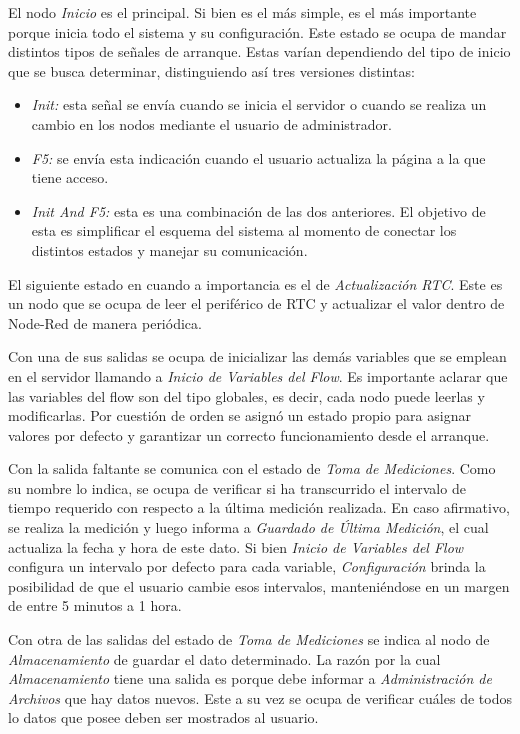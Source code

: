 
El nodo \textit{Inicio} es el principal. Si bien es el más simple, es el más importante porque inicia todo el sistema y su configuración. Este estado se ocupa de mandar distintos tipos de señales de arranque. Estas varían dependiendo del tipo de inicio que se busca determinar, distinguiendo así tres versiones distintas:
\begin{itemize}
	\item \textit{Init:} esta señal se envía cuando se inicia el servidor o cuando se realiza un cambio en los nodos mediante el usuario de administrador.
	\item \textit{F5:} se envía esta indicación cuando el usuario actualiza la página a la que tiene acceso.
	\item \textit{Init And F5:} esta es una combinación de las dos anteriores. El objetivo de esta es simplificar el esquema del sistema al momento de conectar los distintos estados y manejar su comunicación.
\end{itemize}

El siguiente estado en cuando a importancia es el de \textit{Actualización RTC}. Este es un nodo que se ocupa de leer el periférico de RTC y actualizar el valor dentro de Node-Red de manera periódica.

Con una de sus salidas se ocupa de inicializar las demás variables que se emplean en el servidor llamando a \textit{Inicio de Variables del Flow}. Es importante aclarar que las variables del flow son del tipo globales, es decir, cada nodo puede leerlas y modificarlas. Por cuestión de orden se asignó un estado propio para asignar valores por defecto y garantizar un correcto funcionamiento desde el arranque.

Con la salida faltante se comunica con el estado de \textit{Toma de Mediciones}. Como su nombre lo indica, se ocupa de verificar si ha transcurrido el intervalo de tiempo requerido con respecto a la última medición realizada. En caso afirmativo, se realiza la medición y luego informa a \textit{Guardado de Última Medición}, el cual actualiza la fecha y hora de este dato. Si bien \textit{Inicio de Variables del Flow} configura un intervalo por defecto para cada variable, \textit{Configuración} brinda la posibilidad de que el usuario cambie esos intervalos, manteniéndose en un margen de entre 5 minutos a 1 hora.

Con otra de las salidas del estado de \textit{Toma de Mediciones} se indica al nodo de \textit{Almacenamiento} de guardar el dato determinado. La razón por la cual \textit{Almacenamiento} tiene una salida es porque debe informar a \textit{Administración de Archivos} que hay datos nuevos. Este a su vez se ocupa de verificar cuáles de todos lo datos que posee deben ser mostrados al usuario. 

